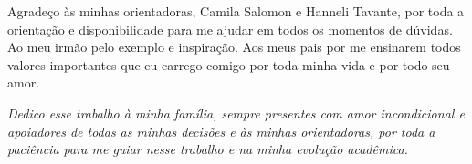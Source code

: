 \documentclass[
	12pt,				%
	oneside,			%
	a4paper,			%
	english,			%
	brazil				%
	]{abntex2}
\begin{document}
\begin{agradecimentos}

	Agradeço às minhas orientadoras, Camila Salomon e Hanneli Tavante, por toda a orientação e disponibilidade para me ajudar em todos os momentos de dúvidas.
	Ao meu irmão pelo exemplo e inspiração.
	Aos meus pais por me ensinarem todos valores importantes que eu carrego comigo por toda minha vida e por todo seu amor. 
	
\end{agradecimentos}

\begin{dedicatoria}
   \vspace*{\fill}
   \centering
   \noindent
   \textit{	Dedico esse trabalho à minha família, sempre presentes com amor incondicional e apoiadores de todas as minhas decisões e às minhas orientadoras, por toda a paciência para me guiar nesse trabalho e na minha evolução acadêmica.	}  \vspace* {\fill}
\end{dedicatoria}

\end{document}
